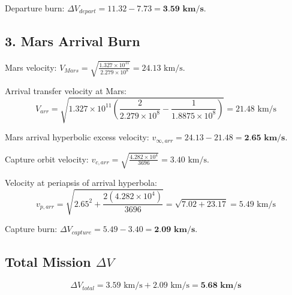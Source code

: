 \documentclass[12pt]{article}
\begin{document}
Departure burn: $\Delta V_{depart} = 11.32 - 7.73 = \textbf{3.59 km/s}$.

\subsection*{3. Mars Arrival Burn}
Mars velocity: $V_{Mars} = \sqrt{\frac{1.327 \times 10^{11}}{2.279 \times 10^8}} = 24.13 \text{ km/s}$.

Arrival transfer velocity at Mars:
\begin{equation*}
    V_{arr} = \sqrt{1.327 \times 10^{11} \left( \frac{2}{2.279 \times 10^8} - \frac{1}{1.8875 \times 10^8} \right)} = 21.48 \text{ km/s}
\end{equation*}

Mars arrival hyperbolic excess velocity: $v_{\infty, arr} = 24.13 - 21.48 = \textbf{2.65 km/s}$.

Capture orbit velocity: $v_{c, arr} = \sqrt{\frac{4.282 \times 10^4}{3696}} = 3.40 \text{ km/s}$.

Velocity at periapsis of arrival hyperbola:
\begin{equation*}
    v_{p, arr} = \sqrt{2.65^2 + \frac{2(4.282 \times 10^4)}{3696}} = \sqrt{7.02 + 23.17} = 5.49 \text{ km/s}
\end{equation*}

Capture burn: $\Delta V_{capture} = 5.49 - 3.40 = \textbf{2.09 km/s}$.

\subsection*{Total Mission $\Delta V$}
\begin{equation*}
    \Delta V_{total} = 3.59 \text{ km/s} + 2.09 \text{ km/s} = \textbf{5.68 km/s}
\end{equation*}
\end{document}
